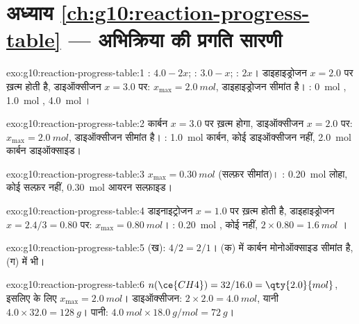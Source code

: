 \section*{अध्याय \ref{ch:g10:reaction-progress-table} --- अभिक्रिया की प्रगति सारणी}

\begin{solution}{exo:g10:reaction-progress-table:1}
: $4.0 - 2x$; : $3.0 - x$; : $2x$। डाइहाइड्रोजन
$x = 2.0$ पर ख़त्म होती है, डाइऑक्सीजन $x = 3.0$ पर: $x_{\max} = \qty{2.0}{mol}$,
डाइहाइड्रोजन सीमांत है। : \qty{0}{mol} ,
\qty{1.0}{mol} , \qty{4.0}{mol} ।
\end{solution}

\begin{solution}{exo:g10:reaction-progress-table:2}
कार्बन $x = 3.0$ पर ख़त्म होगा, डाइऑक्सीजन $x = 2.0$ पर:
$x_{\max} = \qty{2.0}{mol}$, डाइऑक्सीजन सीमांत है। :
\qty{1.0}{mol} कार्बन, कोई डाइऑक्सीजन नहीं, \qty{2.0}{mol} कार्बन डाइऑक्साइड।
\end{solution}

\begin{solution}{exo:g10:reaction-progress-table:3}
$x_{\max} = \qty{0.30}{mol}$ (सल्फ़र सीमांत)। :
\qty{0.20}{mol} लोहा, कोई सल्फ़र नहीं, \qty{0.30}{mol} आयरन सल्फ़ाइड।
\end{solution}

\begin{solution}{exo:g10:reaction-progress-table:4}
डाइनाइट्रोजन $x = 1.0$ पर ख़त्म होती है, डाइहाइड्रोजन $x = 2.4/3 = 0.80$ पर:
$x_{\max} = \qty{0.80}{mol}$। : \qty{0.20}{mol} , कोई
 नहीं, $2 \times 0.80 = \qty{1.6}{mol}$ ।
\end{solution}

\begin{solution}{exo:g10:reaction-progress-table:5}
(ख): $4/2 = 2/1$। (क) में कार्बन मोनोऑक्साइड सीमांत है, (ग) में भी।
\end{solution}

\begin{solution}{exo:g10:reaction-progress-table:6}
$n(\ce{CH4}) = 32 / 16.0 = \qty{2.0}{mol}$, इसलिए  के लिए
$x_{\max} = \qty{2.0}{mol}$। डाइऑक्सीजन: $2 \times 2.0 = \qty{4.0}{mol}$,
यानी $4.0 \times 32.0 = \qty{128}{g}$। पानी:
$\qty{4.0}{mol} \times \qty{18.0}{g/mol} = \qty{72}{g}$।
\end{solution}

